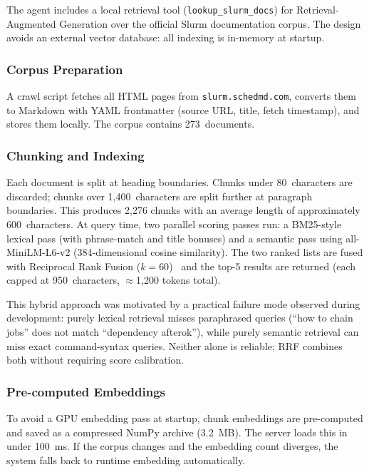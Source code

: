 The agent includes a local retrieval tool (\texttt{lookup\_slurm\_docs}) for Retrieval-Augmented Generation over the official Slurm documentation corpus. The design avoids an external vector database: all indexing is in-memory at startup.

\subsubsection{Corpus Preparation}

A crawl script fetches all HTML pages from \texttt{slurm.schedmd.com}, converts them to Markdown with YAML frontmatter (source URL, title, fetch timestamp), and stores them locally. The corpus contains 273~documents.

\subsubsection{Chunking and Indexing}

Each document is split at heading boundaries. Chunks under 80~characters are discarded; chunks over 1{,}400~characters are split further at paragraph boundaries. This produces 2{,}276 chunks with an average length of approximately 600~characters. At query time, two parallel scoring passes run: a BM25-style lexical pass (with phrase-match and title bonuses) and a semantic pass using all-MiniLM-L6-v2 (384-dimensional cosine similarity). The two ranked lists are fused with Reciprocal Rank Fusion ($k=60$)~\cite{cormack2009reciprocal} and the top-5 results are returned (each capped at 950~characters, $\approx$1{,}200 tokens total).

This hybrid approach was motivated by a practical failure mode observed during development: purely lexical retrieval misses paraphrased queries (``how to chain jobs'' does not match ``dependency afterok''), while purely semantic retrieval can miss exact command-syntax queries. Neither alone is reliable; RRF combines both without requiring score calibration.

\subsubsection{Pre-computed Embeddings}

To avoid a GPU embedding pass at startup, chunk embeddings are pre-computed and saved as a compressed NumPy archive (3.2~MB). The server loads this in under 100~ms. If the corpus changes and the embedding count diverges, the system falls back to runtime embedding automatically.


